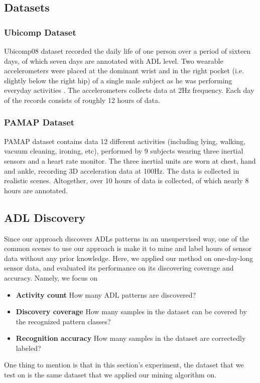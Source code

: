 \documentclass{sigchi}
\begin{document}
    \subsection{Datasets}

    \subsubsection{Ubicomp Dataset}
    Ubicomp08 dataset \cite{huynh2008discovery} recorded the daily life of one person over a period of sixteen days, of which seven days are annotated with ADL level.
    Two wearable accelerometers were placed at the dominant wrist and in the right pocket (i.e. slightly below the right hip) of a single male subject as he was performing everyday activities .
    The accelerometers collects data at 2Hz frequency.
    Each day of the records consists of roughly 12 hours of data.

    \subsubsection{PAMAP Dataset}
    PAMAP dataset \cite{reiss2012introducing, reiss2012creating} contains data 12 different activities (including lying, walking, vacuum cleaning, ironing, etc), performed by 9 subjects wearing three inertial sensors and a heart rate monitor.
    The three inertial units are worn at chest, hand and ankle, recording 3D acceleration data at 100Hz.
    The data is collected in realistic scenes.
    Altogether, over 10 hours of data is collected, of which nearly 8 hours are annotated.


    \subsection{ADL Discovery}
    \label{subsec.exp.mining-on-same-day}

    Since our approach discovers ADLs patterns in an unsupervised way, one of the common scenes to use our approach is make it to mine and label hours of sensor data without any prior knowledge.
    Here, we applied our method on one-day-long sensor data, and evaluated its performance on its discovering coverage and accuracy.
    Namely, we focus on
        \begin{itemize}
        \item \textbf{Activity count} How many ADL patterns are discovered?
        \item \textbf{Discovery coverage} How many samples in the dataset can be covered by the recognized pattern classes?
        \item \textbf{Recognition accuracy} How many samples in the dataset are correctedly labeled?
        \end{itemize}
    One thing to mention is that in this section's experiment, the dataset that we test on is the same dataset that we applied our mining algorithm on.
\end{document}
